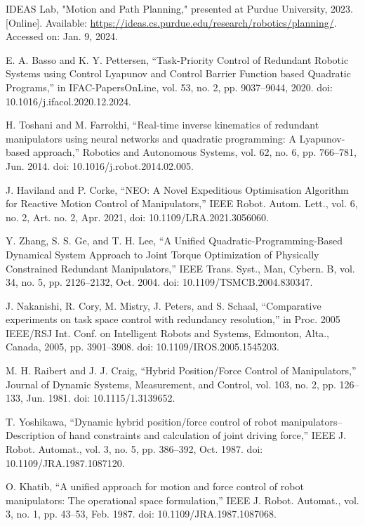 \documentclass[letterpaper, 10 pt, conference]{ieeeconf}  %
\begin{document}
\begin{thebibliography}{99}
	
IDEAS Lab, "Motion and Path Planning," presented at Purdue University, 2023. [Online]. Available: \url{https://ideas.cs.purdue.edu/research/robotics/planning/}. Accessed on: Jan. 9, 2024.
	
 E. A. Basso and K. Y. Pettersen, “Task-Priority Control of Redundant Robotic Systems using Control Lyapunov and Control Barrier Function based Quadratic Programs,” in IFAC-PapersOnLine, vol. 53, no. 2, pp. 9037–9044, 2020. doi: 10.1016/j.ifacol.2020.12.2024.


 H. Toshani and M. Farrokhi, “Real-time inverse kinematics of redundant manipulators using neural networks and quadratic programming: A Lyapunov-based approach,” Robotics and Autonomous Systems, vol. 62, no. 6, pp. 766–781, Jun. 2014. doi: 10.1016/j.robot.2014.02.005.

 J. Haviland and P. Corke, “NEO: A Novel Expeditious Optimisation Algorithm for Reactive Motion Control of Manipulators,” IEEE Robot. Autom. Lett., vol. 6, no. 2, Art. no. 2, Apr. 2021, doi: 10.1109/LRA.2021.3056060.


 Y. Zhang, S. S. Ge, and T. H. Lee, “A Unified Quadratic-Programming-Based Dynamical System Approach to Joint Torque Optimization of Physically Constrained Redundant Manipulators,” IEEE Trans. Syst., Man, Cybern. B, vol. 34, no. 5, pp. 2126–2132, Oct. 2004. doi: 10.1109/TSMCB.2004.830347.

 J. Nakanishi, R. Cory, M. Mistry, J. Peters, and S. Schaal, “Comparative experiments on task space control with redundancy resolution,” in Proc. 2005 IEEE/RSJ Int. Conf. on Intelligent Robots and Systems, Edmonton, Alta., Canada, 2005, pp. 3901–3908. doi: 10.1109/IROS.2005.1545203.

 M. H. Raibert and J. J. Craig, “Hybrid Position/Force Control of Manipulators,” Journal of Dynamic Systems, Measurement, and Control, vol. 103, no. 2, pp. 126–133, Jun. 1981. doi: 10.1115/1.3139652.

 T. Yoshikawa, “Dynamic hybrid position/force control of robot manipulators--Description of hand constraints and calculation of joint driving force,” IEEE J. Robot. Automat., vol. 3, no. 5, pp. 386–392, Oct. 1987. doi: 10.1109/JRA.1987.1087120.

 O. Khatib, “A unified approach for motion and force control of robot manipulators: The operational space formulation,” IEEE J. Robot. Automat., vol. 3, no. 1, pp. 43–53, Feb. 1987. doi: 10.1109/JRA.1987.1087068.


\end{thebibliography}
\end{document}
